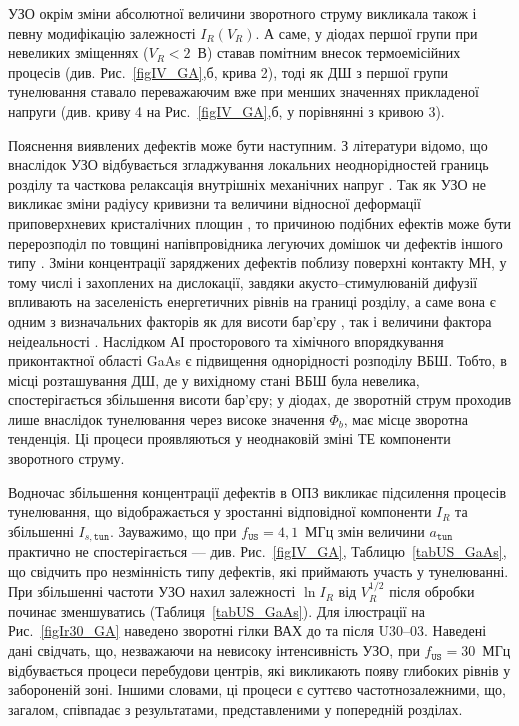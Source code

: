 \documentclass[a4paper,14pt,oneside,openany]{memoir}
\begin{document}
УЗО окрім зміни абсолютної величини зворотного струму викликала також і певну модифікацію залежності $I_R(V_R)$.
А саме, у діодах першої групи при невеликих зміщеннях ($V_R<2$~В) ставав помітним внесок термоемісійних процесів (див. Рис.~\ref{figIV_GA},б, крива 2),
тоді як ДШ з першої групи тунелювання ставало переважаючим вже при менших значеннях прикладеної напруги (див. криву 4 на Рис.~\ref{figIV_GA},б, у порівнянні з кривою 3).

Пояснення виявлених дефектів може бути наступним.
З літератури  відомо, що внаслідок УЗО відбувається згладжування локальних неоднорідностей границь розділу \cite{Parchinskii2003r} та
часткова релаксація внутрішніх механічних напруг \cite{BritunFTT,Zdeb1989}.
Так як УЗО не викликає зміни  радіусу кривизни та величини відносної деформації приповерхневих кристалічних площин \cite{UST:SDErmol},
то причиною подібних ефектів може бути перерозподіл по товщині напівпровідника легуючих домішок \cite{Zaver} чи дефектів іншого типу \cite{Ostrov2002FTPr}.
Зміни концентрації заряджених дефектів поблизу поверхні контакту МН, у тому числі і захоплених на дислокації, завдяки акусто--стимулюваній дифузії впливають на заселеність енергетичних рівнів на границі розділу, а саме вона є одним з визначальних факторів як для висоти бар’єру \cite{Rhoderick1988,Singh1994},
так і величини фактора неідеальності \cite{Ikoma}.
Наслідком АІ просторового та хімічного впорядкування приконтактної області GaAs є підвищення однорідності розподілу ВБШ.
Тобто, в місці розташування ДШ, де у вихідному стані ВБШ була невелика, спостерігається збільшення висоти бар'єру;
у діодах, де зворотній струм проходив лише внаслідок тунелювання через високе значення $\Phi_b$, має місце зворотна тенденція.
Ці процеси проявляються у неоднаковій зміні ТЕ компоненти зворотного струму.

Водночас збільшення концентрації дефектів в ОПЗ викликає підсилення процесів тунелювання, що відображається у зростанні відповідної компоненти $I_R$
та збільшенні $I_{s,\mathtt{tun}}$.
Зауважимо, що при $f_\mathtt{US}=4,1$~МГц змін величини $a_\mathtt{tun}$ практично не спостерігається --- див. Рис.~\ref{figIV_GA}, Таблицю~\ref{tabUS_GaAs},
що свідчить про незмінність типу дефектів, які приймають участь у тунелюванні.
При збільшенні частоти УЗО нахил залежності $\ln I_R$ від $V_R^{1/2}$  після обробки починає зменшуватись (Таблиця~\ref{tabUS_GaAs}).
Для ілюстрації на Рис.~\ref{figIr30_GA} наведено зворотні гілки ВАХ до та після U30--03.
Наведені дані свідчать, що, незважаючи на невисоку інтенсивність УЗО, при $f_\mathtt{US}=30$~МГц відбувається процеси перебудови центрів, які викликають появу глибоких рівнів у забороненій зоні.
Іншими словами, ці процеси є суттєво частотнозалежними, що, загалом, співпадає з результатами, представленими у попередній розділах.
\end{document}
